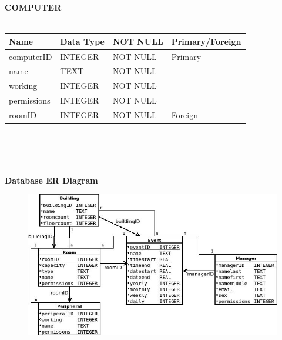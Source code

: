 \documentclass{article}
\begin{document}
\textbf{\Large COMPUTER}\\\\
\begin{tabularx}{\textwidth}{|X|X|X|X|}
    \hline
    \textbf{\large Name} & \textbf{\large Data Type} & \textbf{\large NOT NULL} & \textbf{\large Primary/Foreign} \\ \hline computerID & INTEGER & NOT NULL & Primary \\ \hline name & TEXT & NOT NULL & \\ \hline working & INTEGER & NOT NULL & \\ \hline permissions & INTEGER & NOT NULL & \\ \hline  roomID & INTEGER & NOT NULL & Foreign \\ \hline
\end{tabularx}\\\\\\
\begin{center}\textbf{\large Database ER Diagram}\end{center}
\begin{figure}[ht!]
\centering
\includegraphics[width=150mm]{erumldia.jpg}
\end{figure}
\end{document}
